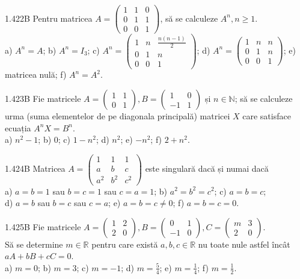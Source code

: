 \documentclass[11pt]{article}
\begin{document}
1.422B Pentru matricea $A=\left(\begin{array}{lll}1 & 1 & 0 \\ 0 & 1 & 1 \\ 0 & 0 & 1\end{array}\right)$, să se calculeze $A^{n}, n \geq 1$.\\ a) $A^{n}=A$; b) $A^{n}=I_{3}$; c) $A^{n}=\left(\begin{array}{ccc}1 & n & \frac{n(n-1)}{2} \\ 0 & 1 & n \\ 0 & 0 & 1\end{array}\right)$; d) $A^{n}=\left(\begin{array}{ccc}1 & n & n \\ 0 & 1 & n \\ 0 & 0 & 1\end{array}\right)$; e) matricea nulă; f) $A^{n}=A^{2}$.

1.423B Fie matricele $A=\left(\begin{array}{ll}1 & 1 \\ 0 & 1\end{array}\right), B=\left(\begin{array}{cc}1 & 0 \\ -1 & 1\end{array}\right)$ și $n \in \mathbb{N}$; să se calculeze urma (suma elementelor de pe diagonala principală) matricei $X$ care satisface ecuația $A^{n} X=B^{n}$.\\ a) $n^{2}-1$; b) $0$; c) $1-n^{2}$; d) $n^{2}$; e) $-n^{2}$; f) $2+n^{2}$.

1.424B Matricea $A=\left(\begin{array}{ccc}1 & 1 & 1 \\ a & b & c \\ a^{2} & b^{2} & c^{2}\end{array}\right)$ este singulară dacă și numai dacă\\ a) $a=b=1$ sau $b=c=1$ sau $c=a=1$; b) $a^{2}=b^{2}=c^{2}$; c) $a=b=c$;\\ d) $a=b$ sau $b=c$ sau $c=a$; e) $a=b=c \neq 0$; f) $a=b=c=0$.

1.425B Fie matricele $A=\left(\begin{array}{ll}1 & 2 \\ 2 & 0\end{array}\right), B=\left(\begin{array}{cc}0 & 1 \\ -1 & 0\end{array}\right), C=\left(\begin{array}{cc}m & 3 \\ 2 & 0\end{array}\right)$.\\ Să se determine $m \in \mathbb{R}$ pentru care există $a, b, c \in \mathbb{R}$ nu toate nule astfel încât $a A+b B+c C=0$.\\ a) $m=0$; b) $m=3$; c) $m=-1$; d) $m=\frac{5}{4}$; e) $m=\frac{1}{4}$; f) $m=\frac{1}{2}$.
\end{document}
